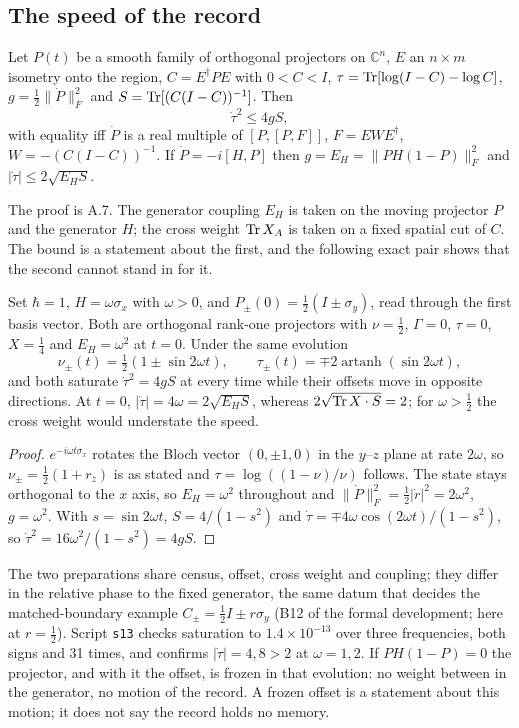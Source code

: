\subsection{The speed of the record}\label{sec:speed}
\begin{theorem}\label{thm:speed}
Let $P(t)$ be a smooth family of orthogonal projectors on $\mathbb C^n$, $E$ an $n\times m$ isometry onto the region, $C=E^\dagger PE$ with $0<C<I$, $\tau=\operatorname{Tr}[\log(I-C)-\log C]$, $g=\tfrac12\|\dot P\|_F^2$ and $S=\operatorname{Tr}[(C(I-C))^{-1}]$. Then
\begin{equation}
\dot\tau^2\le4gS,
\end{equation}
with equality iff $\dot P$ is a real multiple of $[P,[P,F]]$, $F=EWE^\dagger$, $W=-(C(I-C))^{-1}$. If $\dot P=-i[H,P]$ then $g=E_H=\|PH(1-P)\|_F^2$ and $|\dot\tau|\le2\sqrt{E_HS}$. 
\end{theorem}
The proof is A.7. The generator coupling $E_H$ is taken on the moving projector $P$ and the generator $H$; the cross weight $\operatorname{Tr} X_A$ is taken on a fixed spatial cut of $C$. The bound is a statement about the first, and the following exact pair shows that the second cannot stand in for it.

\begin{proposition}\label{prop:joint}
Set $\hbar=1$, $H=\omega\sigma_x$ with $\omega>0$, and $P_\pm(0)=\tfrac12(I\pm\sigma_y)$, read through the first basis vector. Both are orthogonal rank-one projectors with $\nu=\tfrac12$, $\Gamma=0$, $\tau=0$, $X=\tfrac14$ and $E_H=\omega^2$ at $t=0$. Under the same evolution
\[
\nu_\pm(t)=\tfrac12(1\pm\sin2\omega t),\qquad \tau_\pm(t)=\mp2\operatorname{artanh}(\sin2\omega t),
\]
and both saturate $\dot\tau^2=4gS$ at every time while their offsets move in opposite directions. At $t=0$, $|\dot\tau|=4\omega=2\sqrt{E_HS}$, whereas $2\sqrt{\operatorname{Tr} X\cdot S}=2$; for $\omega>\tfrac12$ the cross weight would understate the speed. 
\end{proposition}
\begin{proof}
$e^{-i\omega t\sigma_x}$ rotates the Bloch vector $(0,\pm1,0)$ in the $y$–$z$ plane at rate $2\omega$, so $\nu_\pm=\tfrac12(1+r_z)$ is as stated and $\tau=\log((1-\nu)/\nu)$ follows. The state stays orthogonal to the $x$ axis, so $E_H=\omega^2$ throughout and $\|\dot P\|_F^2=\tfrac12|\dot r|^2=2\omega^2$, $g=\omega^2$. With $s=\sin2\omega t$, $S=4/(1-s^2)$ and $\dot\tau=\mp4\omega\cos(2\omega t)/(1-s^2)$, so $\dot\tau^2=16\omega^2/(1-s^2)=4gS$.
\end{proof}
The two preparations share census, offset, cross weight and coupling; they differ in the relative phase to the fixed generator, the same datum that decides the matched-boundary example $C_\pm=\tfrac12I\pm r\sigma_y$ (B12 of the formal development; here at $r=\tfrac12$). Script \texttt{s13} checks saturation to $1.4\times10^{-13}$ over three frequencies, both signs and 31 times, and confirms $|\dot\tau|=4,8>2$ at $\omega=1,2$. If $PH(1-P)=0$ the projector, and with it the offset, is frozen in that evolution: no weight between in the generator, no motion of the record. A frozen offset is a statement about this motion; it does not say the record holds no memory.


